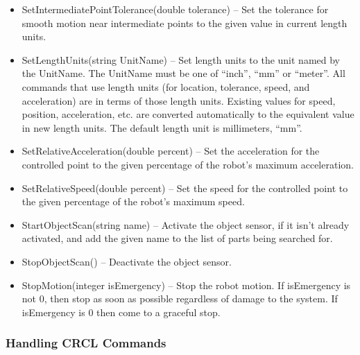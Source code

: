 \begin{itemize}
\item \sf SetIntermediatePointTolerance(double tolerance) \rm -- Set the
  tolerance for smooth motion near intermediate points to the given value
  in current length units.\\

\item \sf SetLengthUnits(string UnitName) \rm -- Set length units to the
  unit named by the \sf UnitName\rm.  The \sf UnitName \rm must be one of
  ``inch'', ``mm'' or ``meter''. All commands that use length units (for
  location, tolerance, speed, and acceleration) are in terms of those
  length units. Existing values for speed, position, acceleration, etc. are
  converted automatically to the equivalent value in new length units. The
  default length unit is millimeters, ``mm''.\\

\item \sf SetRelativeAcceleration(double percent) \rm -- Set the
  acceleration for the controlled point to the given percentage of the
  robot's maximum acceleration.\\

\item \sf SetRelativeSpeed(double percent) \rm -- Set the speed for the
  controlled point to the given percentage of the robot's maximum speed.\\

\item \sf StartObjectScan(string name) \rm -- Activate the object sensor,
  if it isn't already activated, and add the given \sf name \rm to the list of
  parts being searched for.\\

\item \sf StopObjectScan() \rm -- Deactivate the object sensor.\\

\item \sf StopMotion(integer isEmergency) \rm -- Stop the robot motion. If
  \sf isEmergency \rm is not 0, then stop as soon as possible regardless of
  damage to the system. If \sf isEmergency \rm is 0 then come to a graceful
  stop.\\

\end{itemize}

\subsubsection{Handling CRCL Commands}

